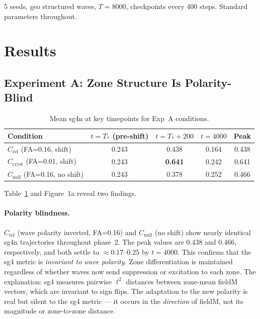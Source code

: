 \documentclass[11pt]{article}
\begin{document}
5 seeds, geo structured waves, $T=8000$, checkpoints every 400 steps.
Standard parameters throughout.

\section{Results}

\subsection{Experiment A: Zone Structure Is Polarity-Blind}

\begin{table}[h]
  \centering
  \caption{Mean sg4n at key timepoints for Exp~A conditions.}
  \label{tab:expa}
  \small
  \begin{tabular}{lcccc}
    \toprule
    Condition & $t=T_*$ (pre-shift) & $t=T_*+200$ & $t=4000$ & Peak \\
    \midrule
    $C_\mathrm{ref}$   (FA=0.16, shift) & 0.243 & 0.438 & 0.164 & 0.438 \\
    $C_\mathrm{cryst}$ (FA=0.01, shift) & 0.243 & \textbf{0.641} & 0.242 & 0.641 \\
    $C_\mathrm{null}$  (FA=0.16, no shift) & 0.243 & 0.378 & 0.252 & 0.466 \\
    \bottomrule
  \end{tabular}
\end{table}

Table~\ref{tab:expa} and Figure~1a reveal two findings.

\paragraph{Polarity blindness.}
$C_\mathrm{ref}$ (wave polarity inverted, FA=0.16) and $C_\mathrm{null}$
(no shift) show nearly identical sg4n trajectories throughout phase~2.
The peak values are 0.438 and 0.466, respectively, and both settle to
$\approx 0.17$--0.25 by $t=4000$.
This confirms that the sg4 metric is \emph{invariant to wave polarity}.
Zone differentiation is maintained regardless of whether waves now send
suppression or excitation to each zone.
The explanation: sg4 measures pairwise $\ell^2$ distances between zone-mean
fieldM vectors, which are invariant to sign flips.
The adaptation to the new polarity is real but silent to the sg4 metric
--- it occurs in the \emph{direction} of fieldM, not its magnitude or
zone-to-zone distance.
\end{document}
